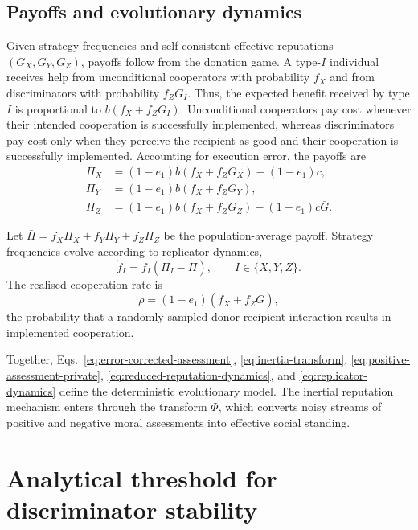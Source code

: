 \documentclass[fleqn,10pt]{wlscirep}
\begin{document}
\subsection*{Payoffs and evolutionary dynamics}

Given strategy frequencies and self-consistent effective reputations $(G_X,G_Y,G_Z)$, payoffs follow from the donation game. A type-$I$ individual receives help from unconditional cooperators with probability $f_X$ and from discriminators with probability $f_ZG_I$. Thus, the expected benefit received by type $I$ is proportional to $b(f_X+f_ZG_I)$. Unconditional cooperators pay cost whenever their intended cooperation is successfully implemented, whereas discriminators pay cost only when they perceive the recipient as good and their cooperation is successfully implemented. Accounting for execution error, the payoffs are
\begin{equation}
\label{eq:payoffs}
\begin{aligned}
\Pi_X &= (1-e_1)b(f_X+f_ZG_X)-(1-e_1)c,\\
\Pi_Y &= (1-e_1)b(f_X+f_ZG_Y),\\
\Pi_Z &= (1-e_1)b(f_X+f_ZG_Z)-(1-e_1)c\bar G .
\end{aligned}
\end{equation}

Let $\bar\Pi=f_X\Pi_X+f_Y\Pi_Y+f_Z\Pi_Z$ be the population-average payoff. Strategy frequencies evolve according to replicator dynamics,
\begin{equation}
\label{eq:replicator-dynamics}
\dot f_I=f_I(\Pi_I-\bar\Pi),\qquad I\in\{X,Y,Z\}.
\end{equation}
The realised cooperation rate is
\[
\rho=(1-e_1)(f_X+f_Z\bar G),
\]
the probability that a randomly sampled donor-recipient interaction results in implemented cooperation.

Together, Eqs.~\eqref{eq:error-corrected-assessment}, \eqref{eq:inertia-transform}, \eqref{eq:positive-assessment-private}, \eqref{eq:reduced-reputation-dynamics}, and \eqref{eq:replicator-dynamics} define the deterministic evolutionary model. The inertial reputation mechanism enters through the transform $\Phi$, which converts noisy streams of positive and negative moral assessments into effective social standing.



\section*{Analytical threshold for discriminator stability}
\end{document}
